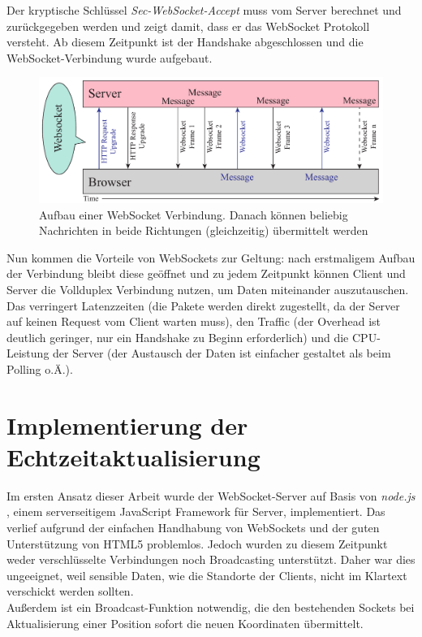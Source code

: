 Der kryptische Schlüssel \emph{Sec-WebSocket-Accept} muss vom Server berechnet und zurückgegeben werden und zeigt damit, dass er das WebSocket Protokoll versteht. Ab diesem Zeitpunkt ist der Handshake abgeschlossen und die WebSocket-Verbindung wurde aufgebaut.\par

\begin{figure}[!ht]
	\centering
	\includegraphics[width=15cm]{fig/websockets}
	\caption[Aufbau einer WebSocket Verbindung]{Aufbau einer WebSocket Verbindung. Danach können beliebig Nachrichten in beide Richtungen (gleichzeitig) übermittelt werden}
\end{figure}

Nun kommen die Vorteile von WebSockets zur Geltung: nach erstmaligem Aufbau der Verbindung bleibt diese geöffnet und zu jedem Zeitpunkt können Client und Server die Vollduplex Verbindung nutzen, um Daten miteinander auszutauschen. Das verringert Latenzzeiten (die Pakete werden direkt zugestellt, da der Server auf keinen Request vom Client warten muss), den Traffic (der Overhead ist deutlich geringer, nur ein Handshake zu Beginn erforderlich) und die CPU-Leistung der Server (der Austausch der Daten ist einfacher gestaltet als beim Polling o.Ä.).

\section{Implementierung der Echtzeitaktualisierung}
Im ersten Ansatz dieser Arbeit wurde der WebSocket-Server auf Basis von \emph{node.js} \cite{node.js}, einem serverseitigem JavaScript Framework für Server, implementiert. Das verlief aufgrund der einfachen Handhabung von WebSockets und der guten Unterstützung von HTML5 problemlos. Jedoch wurden zu diesem Zeitpunkt weder verschlüsselte Verbindungen noch Broadcasting unterstützt. Daher war dies ungeeignet, weil sensible Daten, wie die Standorte der Clients, nicht im Klartext verschickt werden sollten.\\
Außerdem ist ein Broadcast-Funktion notwendig, die den bestehenden Sockets bei Aktualisierung einer Position sofort die neuen Koordinaten übermittelt.\par

